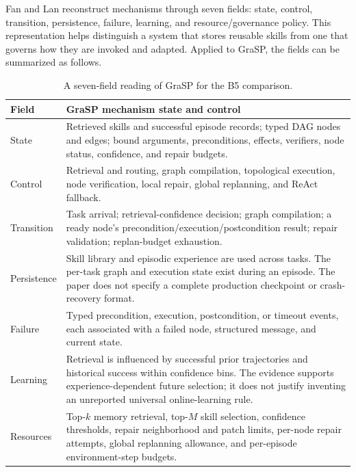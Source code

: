 Fan and Lan reconstruct mechanisms through seven fields: state, control, transition, persistence, failure, learning, and resource/governance policy. This representation helps distinguish a system that stores reusable skills from one that governs how they are invoked and adapted. Applied to GraSP, the fields can be summarized as follows.

\begin{table}[tbp]
\centering
\caption{A seven-field reading of GraSP for the B5 comparison.}
\label{tab:ch17-seven-fields}
\small
\begin{tabularx}{\textwidth}{P{0.23\textwidth}X}
\toprule
\textbf{Field} & \textbf{GraSP mechanism state and control} \\
\midrule
State & Retrieved skills and successful episode records; typed DAG nodes and edges; bound arguments, preconditions, effects, verifiers, node status, confidence, and repair budgets. \\
Control & Retrieval and routing, graph compilation, topological execution, node verification, local repair, global replanning, and ReAct fallback. \\
Transition & Task arrival; retrieval-confidence decision; graph compilation; a ready node's precondition/execution/postcondition result; repair validation; replan-budget exhaustion. \\
Persistence & Skill library and episodic experience are used across tasks. The per-task graph and execution state exist during an episode. The paper does not specify a complete production checkpoint or crash-recovery format. \\
Failure & Typed precondition, execution, postcondition, or timeout events, each associated with a failed node, structured message, and current state. \\
Learning & Retrieval is influenced by successful prior trajectories and historical success within confidence bins. The evidence supports experience-dependent future selection; it does not justify inventing an unreported universal online-learning rule. \\
Resources & Top-\(k\) memory retrieval, top-\(M\) skill selection, confidence thresholds, repair neighborhood and patch limits, per-node repair attempts, global replanning allowance, and per-episode environment-step budgets. \\
\bottomrule
\end{tabularx}
\end{table}

